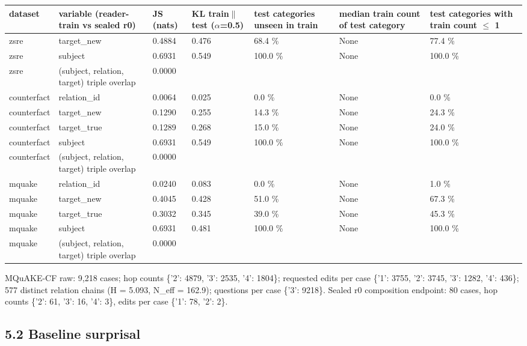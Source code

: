 \documentclass[10pt,a4paper]{article}
\begin{document}
\begin{center}\scriptsize
\begin{tabularx}{\textwidth}{@{}p{}XXXXXX@{}}
\toprule
dataset & variable (reader-train vs sealed r0) & JS (nats) & KL train$\|$test ($\alpha$=0.5) & test categories unseen in train & median train count of test category & test categories with train count $\le$ 1 \\ \midrule
zsre & target\_new & 0.4884 & 0.476 & 68.4 \% & None & 77.4 \% \\
zsre & subject & 0.6931 & 0.549 & 100.0 \% & None & 100.0 \% \\
zsre & (subject, relation, target) triple overlap & 0.0000 &  &  &  &  \\
counterfact & relation\_id & 0.0064 & 0.025 & 0.0 \% & None & 0.0 \% \\
counterfact & target\_new & 0.1290 & 0.255 & 14.3 \% & None & 24.3 \% \\
counterfact & target\_true & 0.1289 & 0.268 & 15.0 \% & None & 24.0 \% \\
counterfact & subject & 0.6931 & 0.549 & 100.0 \% & None & 100.0 \% \\
counterfact & (subject, relation, target) triple overlap & 0.0000 &  &  &  &  \\
mquake & relation\_id & 0.0240 & 0.083 & 0.0 \% & None & 1.0 \% \\
mquake & target\_new & 0.4045 & 0.428 & 51.0 \% & None & 67.3 \% \\
mquake & target\_true & 0.3032 & 0.345 & 39.0 \% & None & 45.3 \% \\
mquake & subject & 0.6931 & 0.481 & 100.0 \% & None & 100.0 \% \\
mquake & (subject, relation, target) triple overlap & 0.0000 &  &  &  &  \\
\bottomrule
\end{tabularx}
\end{center}



MQuAKE-CF raw: 9,218 cases; hop counts \{'2': 4879, '3': 2535, '4': 1804\}; requested edits per case \{'1': 3755, '2': 3745, '3': 1282, '4': 436\}; 577 distinct relation chains (H = 5.093, N\_eff = 162.9); questions per case \{'3': 9218\}. Sealed r0 composition endpoint: 80 cases, hop counts \{'2': 61, '3': 16, '4': 3\}, edits per case \{'1': 78, '2': 2\}.



\subsection*{5.2 Baseline surprisal}
\end{document}

